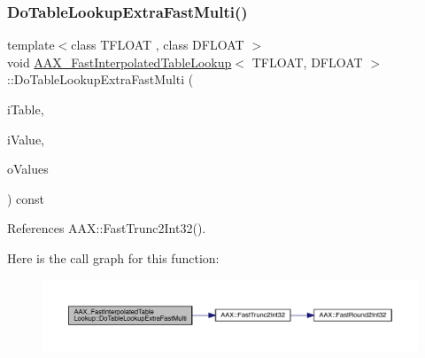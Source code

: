 \subsubsection{\texorpdfstring{DoTableLookupExtraFastMulti()}{DoTableLookupExtraFastMulti()}}
{\footnotesize\ttfamily template$<$class T\+F\+L\+O\+AT , class D\+F\+L\+O\+AT $>$ \\
void \mbox{\hyperlink{a01977}{A\+A\+X\+\_\+\+Fast\+Interpolated\+Table\+Lookup}}$<$ T\+F\+L\+O\+AT, D\+F\+L\+O\+AT $>$\+::Do\+Table\+Lookup\+Extra\+Fast\+Multi (\begin{DoxyParamCaption}\item[{const T\+F\+L\+O\+AT $\ast$}]{i\+Table,  }\item[{D\+F\+L\+O\+AT}]{i\+Value,  }\item[{D\+F\+L\+O\+AT $\ast$}]{o\+Values }\end{DoxyParamCaption}) const\hspace{0.3cm}{\ttfamily [inline]}}



References A\+A\+X\+::\+Fast\+Trunc2\+Int32().

Here is the call graph for this function\+:
\nopagebreak
\begin{figure}[H]
\begin{center}
\leavevmode
\includegraphics[width=350pt]{a01977_a60e89d13066ca0606c8f71cf5313f0e3_cgraph}
\end{center}
\end{figure}
\mbox{\label{a01977_a11b9680510916ee500ced08d3da3fcb2}} 
